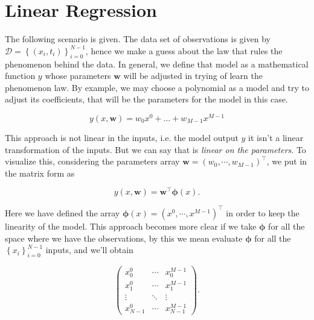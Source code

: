 \documentclass[11pt]{article} %
\begin{document}
\section{Linear Regression}

The following scenario is given. The data set of observations is given by $\mathcal{D} = \left\{ \left( x_i,t_i \right) \right\}_{i=0}^{N-1}$, hence we make a guess about the law that rules the phenomenon behind the data. In general, we define that model as a mathematical function $y$ whose parameters $\mathbf{w}$ will be adjusted in trying of learn the phenomenon law. By example, we may choose a polynomial as a model and try to adjust its coefficients, that will be the parameters for the model in this case.

\begin{equation}
   y\left( x,\mathbf{w} \right) = w_0 x^0 + \dots + w_{M-1} x^{M-1}
\end{equation}

This approach is not linear in the inputs, i.e. the model output $y$ it isn't a linear transformation of the inputs. But we can say that is \textit{linear on the parameters}. To visualize this, considering the parameters array $\mathbf{w} = \left( w_0, \cdots , w_{M-1} \right)^\top$, we put in the matrix form as 

\begin{equation}
   y\left( x,\mathbf{w} \right) = \mathbf{w}^\top \boldsymbol{\phi}(x).
\end{equation}

Here we have defined the array $\boldsymbol{\phi}(x) = \left( x^0, \cdots , x^{M-1} \right)^\top$ in order to keep the linearity of the model. This approach becomes more clear if we take $\boldsymbol{\phi}$ for all the space where we have the observations, by this we mean evaluate $\boldsymbol{\phi}$ for all the $\left\{ x_i \right\}_{i=0}^{N-1}$ inputs, and we'll obtain

\begin{equation}
   \begin{pmatrix}
      x^0_0 & \cdots & x^{M-1}_0 \\
      x^0_1 & \cdots & x^{M-1}_1 \\
      \vdots & \ddots & \vdots \\
      x^0_{N-1} & \cdots & x^{M-1}_{N-1}
   \end{pmatrix}.
\end{equation}
\end{document}
